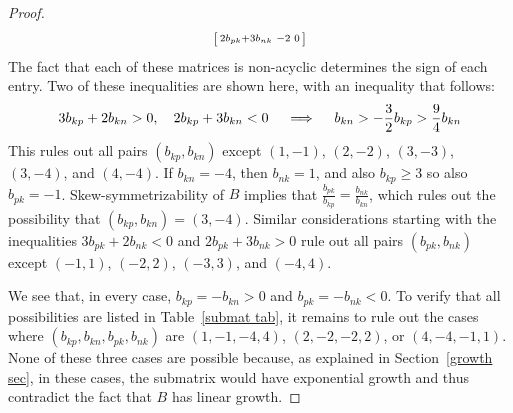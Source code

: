 \documentclass{amsart}
\theoremstyle{definition}
\theoremstyle{remark}
\numberwithin{equation}{section}
\newcommand{\0}{{\mathbf{0}}}
\begin{document}
\begin{proof}
\begin{multline*}
\begin{bsmallmatrix*}
	2b_{pk}+3b_{nk} & -2 & 0
\end{bsmallmatrix*}
\end{multline*}
The fact that each of these matrices is non-acyclic determines the sign of each entry.
Two of these inequalities are shown here, with an inequality that follows:
\[
3b_{kp}+2b_{kn}>0,\quad 2b_{kp}+3b_{kn}<0\quad \implies\quad b_{kn}>-\frac32b_{kp}>\frac94b_{kn}\\
\]
This rules out all pairs $(b_{kp},b_{kn})$ except $(1,-1)$, $(2,-2)$, $(3,-3)$, $(3,-4)$, and $(4,-4)$.
If $b_{kn}=-4$, then $b_{nk}=1$, and also $b_{kp}\ge3$ so also $b_{pk}=-1$.
Skew-symmetrizability of $B$ implies that $\frac{b_{pk}}{b_{kp}}=\frac{b_{nk}}{b_{kn}}$, which rules out the possibility that $(b_{kp},b_{kn})=(3,-4)$.
Similar considerations starting with the inequalities $3b_{pk}+2b_{nk}<0$ and $2b_{pk}+3b_{nk}>0$ rule out all pairs $(b_{pk},b_{nk})$ except $(-1,1)$, $(-2,2)$, $(-3,3)$, and $(-4,4)$.

We see that, in every case, $b_{kp}=-b_{kn}>0$ and $b_{pk}=-b_{nk}<0$.
To verify that all possibilities are listed in Table~\ref{submat tab}, it remains to rule out the cases where $(b_{kp},b_{kn},b_{pk},b_{nk})$ are $(1,-1,-4,4)$, $(2,-2,-2,2)$, or $(4,-4,-1,1)$.
None of these three cases are possible because, as explained in Section~\ref{growth sec}, in these cases, the submatrix would  have exponential growth and thus contradict the fact that $B$ has linear growth.


\end{proof}
\end{document}
